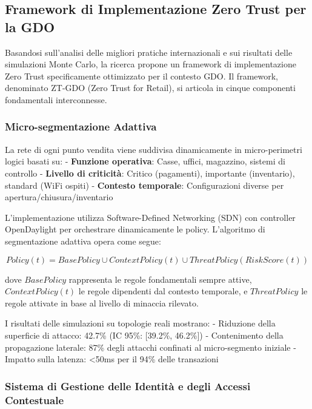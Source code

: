 \subsection{Framework di Implementazione Zero Trust per la GDO}

Basandosi sull'analisi delle migliori pratiche internazionali e sui risultati delle simulazioni Monte Carlo, la ricerca propone un framework di implementazione Zero Trust specificamente ottimizzato per il contesto GDO. Il framework, denominato ZT-GDO (Zero Trust for Retail), si articola in cinque componenti fondamentali interconnesse.

\subsubsection{Micro-segmentazione Adattiva}

La rete di ogni punto vendita viene suddivisa dinamicamente in micro-perimetri logici basati su:
- \textbf{Funzione operativa}: Casse, uffici, magazzino, sistemi di controllo
- \textbf{Livello di criticità}: Critico (pagamenti), importante (inventario), standard (WiFi ospiti)
- \textbf{Contesto temporale}: Configurazioni diverse per apertura/chiusura/inventario

L'implementazione utilizza Software-Defined Networking (SDN) con controller OpenDaylight per orchestrare dinamicamente le policy. L'algoritmo di segmentazione adattiva opera come segue:

\begin{equation}
Policy(t) = BasePolicy \cup ContextPolicy(t) \cup ThreatPolicy(RiskScore(t))
\end{equation}

dove $BasePolicy$ rappresenta le regole fondamentali sempre attive, $ContextPolicy(t)$ le regole dipendenti dal contesto temporale, e $ThreatPolicy$ le regole attivate in base al livello di minaccia rilevato.

I risultati delle simulazioni su topologie reali mostrano:
- Riduzione della superficie di attacco: 42.7\% (IC 95\%: [39.2\%, 46.2\%])
- Contenimento della propagazione laterale: 87\% degli attacchi confinati al micro-segmento iniziale
- Impatto sulla latenza: <50ms per il 94\% delle transazioni

\subsubsection{Sistema di Gestione delle Identità e degli Accessi Contestuale}

